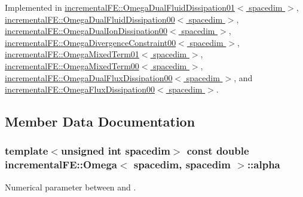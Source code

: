 Implemented in \hyperlink{classincremental_f_e_1_1_omega_dual_fluid_dissipation01_a3c58b42747ba2c2bed05fa670cf55fb5}{incremental\+F\+E\+::\+Omega\+Dual\+Fluid\+Dissipation01$<$ spacedim $>$}, \hyperlink{classincremental_f_e_1_1_omega_dual_fluid_dissipation00_a505f97cabdd9375fe76b714c28088ca6}{incremental\+F\+E\+::\+Omega\+Dual\+Fluid\+Dissipation00$<$ spacedim $>$}, \hyperlink{classincremental_f_e_1_1_omega_dual_ion_dissipation00_a0222bc5e8dfcc93728c230c604439332}{incremental\+F\+E\+::\+Omega\+Dual\+Ion\+Dissipation00$<$ spacedim $>$}, \hyperlink{classincremental_f_e_1_1_omega_divergence_constraint00_a56323a14c158f9008621a9a5d77f1be8}{incremental\+F\+E\+::\+Omega\+Divergence\+Constraint00$<$ spacedim $>$}, \hyperlink{classincremental_f_e_1_1_omega_mixed_term01_a6fe47df6c774ba07cb3455616997dfe7}{incremental\+F\+E\+::\+Omega\+Mixed\+Term01$<$ spacedim $>$}, \hyperlink{classincremental_f_e_1_1_omega_mixed_term00_abf975855eb0155318ad152e7fbac11d1}{incremental\+F\+E\+::\+Omega\+Mixed\+Term00$<$ spacedim $>$}, \hyperlink{classincremental_f_e_1_1_omega_dual_flux_dissipation00_a27833d3c88054ddf2231a32c6c6b2d2d}{incremental\+F\+E\+::\+Omega\+Dual\+Flux\+Dissipation00$<$ spacedim $>$}, and \hyperlink{classincremental_f_e_1_1_omega_flux_dissipation00_a7b9ccca9346b229a5e7f4f2254d932ec}{incremental\+F\+E\+::\+Omega\+Flux\+Dissipation00$<$ spacedim $>$}.



\subsection{Member Data Documentation}
\subsubsection[{\texorpdfstring{alpha}{alpha}}]{\setlength{\rightskip}{0pt plus 5cm}template$<$unsigned int spacedim$>$ const double {\bf incremental\+F\+E\+::\+Omega}$<$ spacedim, spacedim $>$\+::alpha\hspace{0.3cm}{\ttfamily [private]}}\hypertarget{classincremental_f_e_1_1_omega_3_01spacedim_00_01spacedim_01_4_ad881c36804cc027c301f4f069756c2db}{}\label{classincremental_f_e_1_1_omega_3_01spacedim_00_01spacedim_01_4_ad881c36804cc027c301f4f069756c2db}
Numerical parameter between {} and {}.

